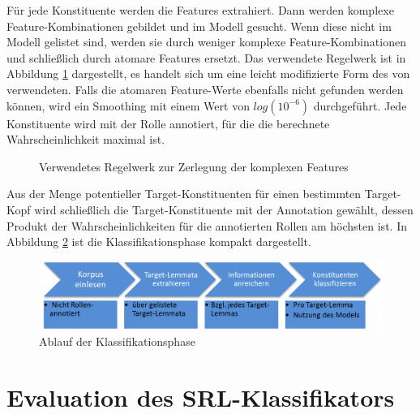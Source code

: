 \documentclass[12pt]{article}
\begin{document}
Für jede Konstituente werden die Features extrahiert. Dann werden komplexe Feature-Kombinationen gebildet und im Modell gesucht. Wenn diese nicht im Modell gelistet sind, werden sie durch weniger komplexe Feature-Kombinationen und schließlich durch atomare Features ersetzt. Das verwendete Regelwerk ist in Abbildung \ref{back_off_model} dargestellt, es handelt sich um eine leicht modifizierte Form des von \cite{gildea} verwendeten. Falls die atomaren Feature-Werte ebenfalls nicht gefunden werden können, wird ein Smoothing mit einem Wert von $log(10^{-6})$ durchgeführt. Jede Konstituente wird mit der Rolle annotiert, für die die berechnete Wahrscheinlichkeit maximal ist.

\begin{figure}
	\centering
	\label{back_off_model}
	\caption{Verwendetes Regelwerk zur Zerlegung der komplexen Features}
\end{figure}


Aus der Menge potentieller Target-Konstituenten für einen bestimmten Target-Kopf wird schließlich die Target-Konstituente mit der Annotation gewählt, dessen Produkt der Wahrscheinlichkeiten für die annotierten Rollen am höchsten ist.
In Abbildung \ref{classify} ist die Klassifikationsphase kompakt dargestellt.

\begin{figure}[tb!]
		\centering
		\includegraphics[scale=0.6]{images/ablaufAnnotate.png}
		\caption{Ablauf der Klassifikationsphase}
		\label{classify}
	\end{figure}


\newpage
\section{Evaluation des SRL-Klassifikators}
\end{document}
